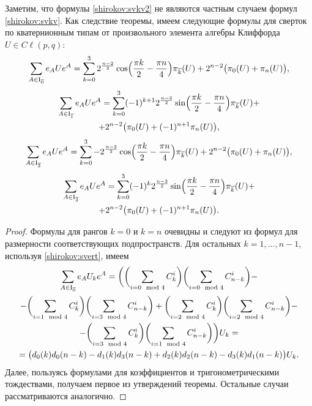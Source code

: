 \smallskip

Заметим, что формулы \eqref{shirokov:svkv2} не являются частным случаем формул \eqref{shirokov:svkv}. 
Как следствие теоремы, имеем следующие формулы для сверток по кватернионным типам от произвольного элемента алгебры Клиффорда $U\in{{C}\!\ell}(p,q)$:
$$
\sum_{A\in{\rm I}_ {\overline 0}} 
e_A U e^A=\sum_{k=0}^3 2^{\frac{n-2}{2}}\cos\Bigl(\frac{\pi k}{2}-\frac{\pi n}{4}\Bigr)\pi_{\overline k}(U)+2^{n-2}\bigl(\pi_0(U)+\pi_n(U)\bigr),$$
\begin{multline}
\sum_{A\in{\rm I}_ {\overline 1}} e_A U e^A=\sum_{k=0}^3(-1)^{k+1}2^{\frac{n-2}{2}}\sin
\Bigl(\frac{\pi k}{2}-\frac{\pi n}{4}\Bigr)\pi_{\overline k}(U)+ \\ + 2^{n-2}\bigl(\pi_0(U)+(-1)^{n+1}\pi_n(U)\bigr),
\label{shirokov:sf}
\end{multline}
$$
\sum_{A\in{\rm I}_ {\overline 2}} e_A U e^A=\sum_{k=0}^3-2^{\frac{n-2}{2}}\cos\Bigl(\frac{\pi k}{2}-\frac{\pi n}{4}\Bigr)\pi_{\overline k}(U)+2^{n-2}\bigl(\pi_0(U)+\pi_n(U)\bigr),
$$
\begin{multline}
\sum_{A\in{\rm I}_ {\overline 3}} e_A U e^A=\sum_{k=0}^3(-1)^{k}2^{\frac{n-2}{2}}\sin\Bigl(\frac{\pi k}{2}-\frac{\pi n}{4}\Bigr)\pi_{\overline k}(U) +\\ +2^{n-2}\bigl(\pi_0(U)+(-1)^{n+1}\pi_n(U)\bigr).
\end{multline}

\smallskip

\begin{proof} Формулы для рангов $k=0$ и $k=n$ очевидны и следуют из формул для размерности соответствующих подпространств.
Для остальных $k=1, \ldots, n-1$, используя \eqref{shirokov:svert}, имеем
\begin{multline}
\sum_{A\in{\rm I}_ {\overline 0}} e_A U_k e^A=\biggl(\biggl(\sum_{i=0\mod 4}C_k^i\biggr)\biggl(\sum_{i=0\mod 4}C_{n-k}^i\biggr)- \\ 
- \biggl(\sum_{i=1\mod 4}C_k^i\biggr)\biggl(\sum_{i=3\mod 4}C_{n-k}^i\biggr)+
\biggl(\sum_{i=2\mod 4}C_k^i\biggr)\biggl(\sum_{i=2\mod 4}C_{n-k}^i\biggr)- \\ -
\biggl(\sum_{i=3\mod 4}C_k^i\biggr)\biggl(\sum_{i=1\mod 4}C_{n-k}^i\biggr)\biggr)U_k=
\\
=\bigl(d_0(k) d_{0}(n-k)-d_{1}(k) d_{3}(n-k)+d_{2}(k) d_{2}(n-k)-d_{3}(k) d_{1}(n-k)\bigr)U_k.
\end{multline}
Далее, пользуясь формулами для коэффициентов и тригонометрическими тождествами, получаем первое из утверждений теоремы.
Остальные случаи рассматриваются аналогично.
\end{proof}

